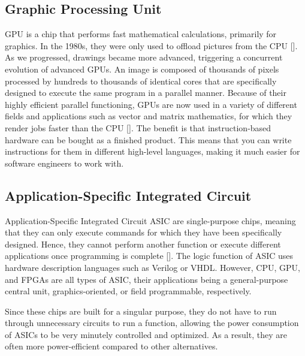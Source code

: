 \subsection{Graphic Processing Unit}
\acrshort{GPU} is a chip that performs fast mathematical calculations, primarily for graphics. In the 1980s, they were only used to offload pictures from the CPU [\cite{GPUvsfpga}]. As we progressed, drawings became more advanced, triggering a concurrent evolution of advanced GPUs. An image is composed of thousands of pixels processed by hundreds to thousands of identical cores that are specifically designed to execute the same program in a parallel manner. Because of their highly efficient parallel functioning, GPUs are now used in a variety of different fields and applications such as vector and matrix mathematics, for which they render jobs faster than the CPU [\cite{GPUvsfpga}]. The benefit is that instruction-based hardware can be bought as a finished product. This means that you can write instructions for them in different high-level languages, making it much easier for software engineers to work with. 

\subsection{Application-Specific Integrated Circuit}

Application-Specific Integrated Circuit \acrshort{ASIC} are single-purpose chips, meaning that they can only execute commands for which they have been specifically designed. 
Hence, they cannot perform another function or execute different applications once programming is complete [\cite{asic}]. The logic function of ASIC uses hardware description languages such as Verilog or VHDL.
However, CPU, GPU, and FPGAs are all types of ASIC, their applications being a general-purpose central unit, graphics-oriented, or field programmable, respectively.

Since these chips are built for a singular purpose, they do not have to run through unnecessary circuits to run a function, allowing the power consumption of ASICs to be very minutely controlled and optimized. As a result, they are often more power-efficient compared to other alternatives.



